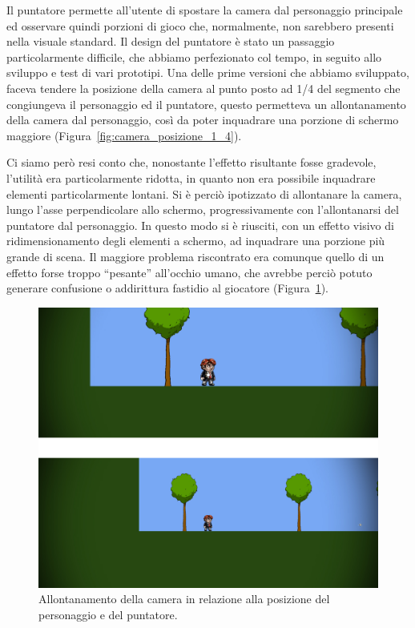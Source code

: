 Il puntatore permette all’utente di spostare la camera dal personaggio principale ed osservare quindi porzioni di gioco che, normalmente, non sarebbero presenti nella visuale standard.
Il design del puntatore è stato un passaggio particolarmente difficile, che abbiamo perfezionato col tempo, in seguito allo sviluppo e test di vari prototipi.
Una delle prime versioni che abbiamo sviluppato, faceva tendere la posizione della camera al punto posto ad 1/4 del segmento che congiungeva il personaggio ed il puntatore, questo permetteva un allontanamento della camera dal personaggio, così da poter inquadrare una porzione di schermo maggiore (Figura~\ref{fig:camera_posizione_1_4}).

Ci siamo però resi conto che, nonostante l’effetto risultante fosse gradevole, l’utilità era particolarmente ridotta, in quanto non era possibile inquadrare elementi particolarmente lontani.
Si è perciò ipotizzato di allontanare la camera, lungo l’asse perpendicolare allo schermo, progressivamente con l’allontanarsi del puntatore dal personaggio.
In questo modo si è riusciti, con un effetto visivo di ridimensionamento degli elementi a schermo, ad inquadrare una porzione più grande di scena. Il maggiore problema riscontrato era comunque quello di un effetto forse troppo “pesante” all’occhio umano, che avrebbe perciò potuto generare confusione o addirittura fastidio al giocatore (Figura~\ref{fig:camera_allontanamento}).

\begin{figure}%
	\centering
	\includegraphics[width= 0.85\columnwidth]{images/gameDesign/16.jpg}
	\caption{Allontanamento della camera in relazione alla posizione del personaggio e del puntatore.}
	\label{fig:camera_allontanamento}
\end{figure}

